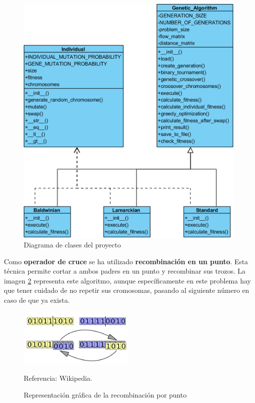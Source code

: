 \begin{figure}[H]
  \centering
  \includegraphics[width=1\textwidth]{../images/class-diagram}
  \caption{Diagrama de clases del proyecto}
  \label{fig:class-diagram}
\end{figure}

\newpage

Como \textbf{operador de cruce} se ha utilizado \textbf{recombinación en un punto}. Esta técnica permite cortar a ambos padres en un punto y recombinar sus trozos. La imagen \ref{fig:recombinacion-por-punto} representa este algoritmo, aunque específicamente en este problema hay que tener cuidado de no repetir sus cromosomas, pasando al siguiente número en caso de que ya exista.

\begin{figure}[H]
  \centering
  \captionsetup{justification=centering}
  \includegraphics[width=0.5\textwidth]{../images/recombinacion-por-punto}
  \caption{Representación gráfica de la recombinación por punto}
  \small Referencia: Wikipedia.
  \label{fig:recombinacion-por-punto}
\end{figure}

